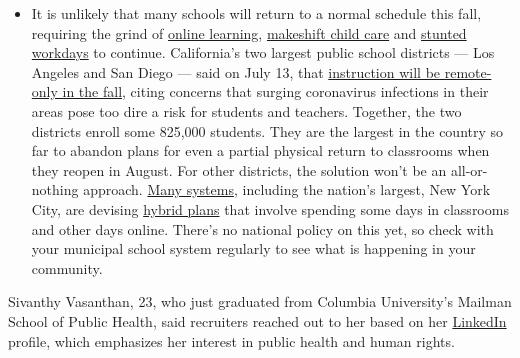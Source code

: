 \begin{itemize}
  \begin{itemize}
  \tightlist
  \item
    It is unlikely that many schools will return to a normal schedule
    this fall, requiring the grind of
    \href{https://www.nytimes3xbfgragh.onion/2020/06/05/us/coronavirus-education-lost-learning.html?action=click\&pgtype=Article\&state=default\&region=MAIN_CONTENT_3\&context=storylines_faq}{online
    learning},
    \href{https://www.nytimes3xbfgragh.onion/2020/05/29/us/coronavirus-child-care-centers.html?action=click\&pgtype=Article\&state=default\&region=MAIN_CONTENT_3\&context=storylines_faq}{makeshift
    child care} and
    \href{https://www.nytimes3xbfgragh.onion/2020/06/03/business/economy/coronavirus-working-women.html?action=click\&pgtype=Article\&state=default\&region=MAIN_CONTENT_3\&context=storylines_faq}{stunted
    workdays} to continue. California's two largest public school
    districts --- Los Angeles and San Diego --- said on July 13, that
    \href{https://www.nytimes3xbfgragh.onion/2020/07/13/us/lausd-san-diego-school-reopening.html?action=click\&pgtype=Article\&state=default\&region=MAIN_CONTENT_3\&context=storylines_faq}{instruction
    will be remote-only in the fall}, citing concerns that surging
    coronavirus infections in their areas pose too dire a risk for
    students and teachers. Together, the two districts enroll some
    825,000 students. They are the largest in the country so far to
    abandon plans for even a partial physical return to classrooms when
    they reopen in August. For other districts, the solution won't be an
    all-or-nothing approach.
    \href{https://bioethics.jhu.edu/research-and-outreach/projects/eschool-initiative/school-policy-tracker/}{Many
    systems}, including the nation's largest, New York City, are
    devising
    \href{https://www.nytimes3xbfgragh.onion/2020/06/26/us/coronavirus-schools-reopen-fall.html?action=click\&pgtype=Article\&state=default\&region=MAIN_CONTENT_3\&context=storylines_faq}{hybrid
    plans} that involve spending some days in classrooms and other days
    online. There's no national policy on this yet, so check with your
    municipal school system regularly to see what is happening in your
    community.
  \end{itemize}
\end{itemize}

Sivanthy Vasanthan, 23, who just graduated from Columbia University's
Mailman School of Public Health, said recruiters reached out to her
based on her
\href{https://www.linkedin.com/in/sivanthyvasanthan/}{LinkedIn} profile,
which emphasizes her interest in public health and human rights.

